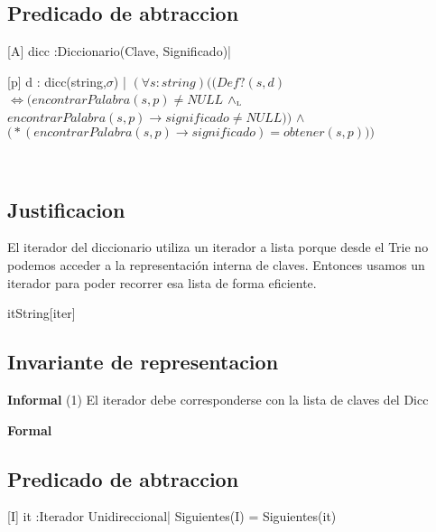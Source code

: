 \begin{Representacion}
\subsection{Predicado de abtraccion}

[A]{ dicc :Diccionario(Clave, Significado)| }

[p]{ d : dicc(string,$\sigma$) | $(\forall s:string)\Big( \big(Def?(s,d)$ $\Longleftrightarrow (encontrarPalabra(s,p) \neq NULL$ $\land_{\mathrm{\scriptscriptstyle{L}}}$ $encontrarPalabra(s,p)\to significado \neq NULL)\big)$ $\land$ $\big(*(encontrarPalabra(s,p)\to significado) = obtener(s,p)\big)\Big)$}


~  


\subsection{Justificacion}
El iterador del diccionario utiliza un iterador a lista porque desde el Trie no podemos acceder a la representaci\'on interna de claves. Entonces usamos un iterador para poder recorrer esa lista de forma eficiente.

\begin{Estructura}{itString}[iter]
	\begin{Tupla}[iter]
	\end{Tupla}
\end{Estructura}

\subsection{Invariante de representacion}

\textbf{Informal}
(1) El iterador debe corresponderse con la lista de claves del Dicc

\textbf{Formal}

\subsection{Predicado de abtraccion}

[I]{ it :Iterador Unidireccional| Siguientes(I) = Siguientes(it)}

\end{Representacion}

